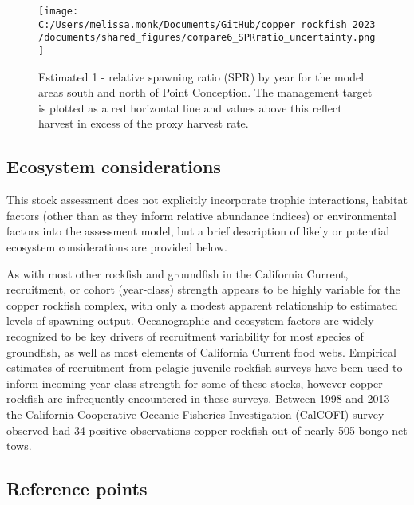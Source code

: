 \documentclass[11pt,
  english,
  letterpaper,
]{article}
\begin{document}




\begin{figure}
\centering
\texttt{[image: C:/Users/melissa.monk/Documents/GitHub/copper\_rockfish\_2023/documents/shared\_figures/compare6\_SPRratio\_uncertainty.png]}
\caption{Estimated 1 - relative spawning ratio (SPR) by year for the model areas south and north of Point Conception. The management target is plotted as a red horizontal line and values above this reflect harvest in excess of the proxy harvest rate.\label{fig:es-1-spr}}
\end{figure}

\pagebreak

\hypertarget{ecosystem-considerations}{%
\subsection*{Ecosystem considerations}\label{ecosystem-considerations}}

This stock assessment does not explicitly incorporate trophic interactions, habitat factors (other than as they inform relative abundance indices) or environmental factors into the assessment model, but a brief description of likely or potential ecosystem considerations are provided below.

As with most other rockfish and groundfish in the California Current, recruitment, or cohort (year-class) strength appears to be highly variable for the copper rockfish complex, with only a modest apparent relationship to estimated levels of spawning output. Oceanographic and ecosystem factors are widely recognized to be key drivers of recruitment variability for most species of groundfish, as well as most elements of California Current food webs. Empirical estimates of recruitment from pelagic juvenile rockfish surveys have been used to inform incoming year class strength for some of these stocks, however copper rockfish are infrequently encountered in these surveys. Between 1998 and 2013 the California Cooperative Oceanic Fisheries Investigation (CalCOFI) survey observed had 34 positive observations copper rockfish out of nearly 505 bongo net tows.

\hypertarget{reference-points}{%
\subsection*{Reference points}\label{reference-points}}
\end{document}
